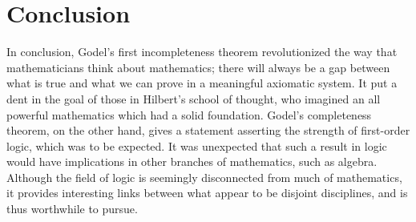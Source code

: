 \documentclass[%
 reprint,
 amsmath,amssymb,
 aps,
]{revtex4-2}
\begin{document}
\section{Conclusion}
In conclusion, Godel's first incompleteness theorem revolutionized the way that mathematicians think about mathematics; there will always be a gap between what is true and what we can prove in a meaningful axiomatic system.  It put a dent in the goal of those in Hilbert's school of thought, who imagined an all powerful mathematics which had a solid foundation.  Godel's completeness theorem, on the other hand, gives a statement asserting the strength of first-order logic, which was to be expected.  It was unexpected that such a result in logic would have implications in other branches of mathematics, such as algebra.  Although the field of logic is seemingly disconnected from much of mathematics, it provides interesting links between what appear to be disjoint disciplines, and is thus worthwhile to pursue.  








\end{document}
